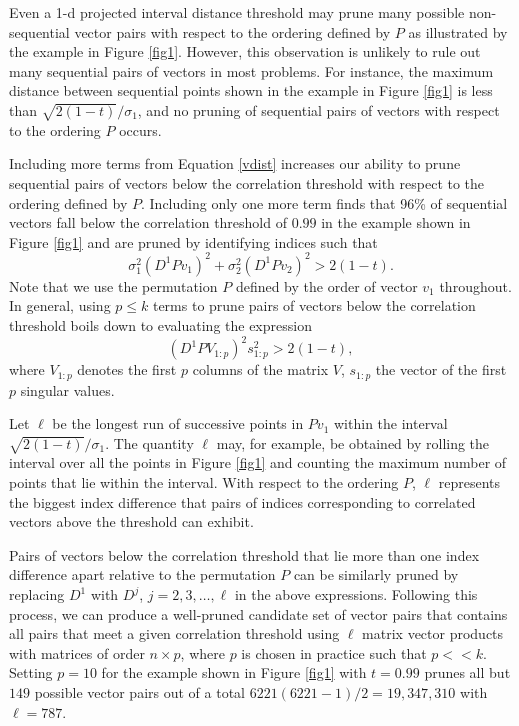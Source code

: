 \documentclass{article}
\numberwithin{algorithmctr}{section}
\begin{document}
Even a 1-d projected interval distance threshold may prune many possible
non-sequential vector pairs with respect to the ordering defined by $P$ as
illustrated by the example in Figure \ref{fig1}.  However, this observation is
unlikely to rule out many sequential pairs of vectors in most problems.  For
instance, the maximum distance between sequential points shown in the example in
Figure \ref{fig1} is less than $\sqrt{2(1-t)}/\sigma_1$, and no pruning of
sequential pairs of vectors with respect to the ordering $P$ occurs.

Including more terms from Equation \ref{vdist} increases our ability to prune
sequential pairs of vectors below the correlation threshold with respect to the
ordering defined by $P$.  Including only one more term finds that 96\% of
sequential vectors fall below the correlation threshold of $0.99$ in the
example shown in Figure \ref{fig1} and are pruned by identifying indices such
that
\[
\sigma_1^2 (D^1 P v_1)^2 +
\sigma_2^2 (D^1 P v_2)^2 > 2(1-t).
\]
Note that we use the permutation $P$ defined by the order of vector $v_1$
throughout.  In general, using $p\le k$ terms to prune pairs of vectors
below the correlation threshold boils down to evaluating the expression
\begin{equation}\label{proj}
(D^1 P V_{1:p} )^2 s_{1:p}^2 > 2(1-t),
\end{equation}
where 
$V_{1:p}$ denotes the first $p$ columns of the
matrix $V$, $s_{1:p}$ the vector of the first $p$ singular values.

Let $\ell$ be the longest run of successive points in $P v_1$ within the
interval $\sqrt{2(1-t)}/\sigma_1$.  The quantity $\ell$ may, for example, be
obtained by rolling the interval over all the points in Figure \ref{fig1} and
counting the maximum number of points that lie within the interval.  With
respect to the ordering $P$, $\ell$ represents the biggest index difference
that pairs of indices corresponding to correlated vectors above the threshold
can exhibit.

Pairs of vectors below the correlation threshold that lie more than one index
difference apart relative to the permutation $P$ can be similarly pruned by
replacing $D^1$ with $D^j$, $j=2,3,\ldots,\ell$ in the above expressions.
Following this process, we can produce a well-pruned candidate set of vector
pairs that contains all pairs that meet a given correlation threshold using
$\ell$ matrix vector products with matrices of order $n \times p$, where $p$ is
chosen in practice such that $p<<k$. Setting $p=10$ for the example shown in
Figure \ref{fig1} with $t=0.99$ prunes all but $149$ possible vector pairs out of a total
$6221(6221 - 1)/2 = 19,347,310$ with $\ell=787$.
\end{document}
